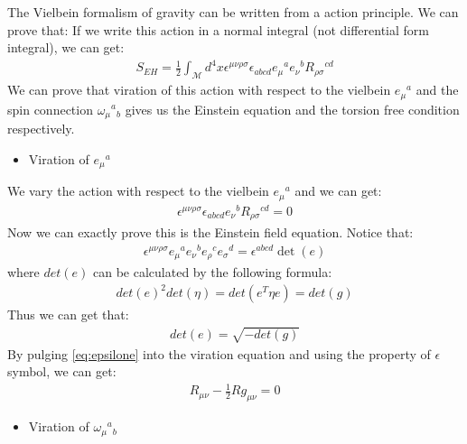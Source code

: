The Vielbein formalism of gravity can be written from a action
principle. We can prove that:
If we write this action in a normal integral (not differential form
integral), we can get:
\begin{align}
  S_{EH} = \displaystyle\frac{1}{2} \int_{\mathcal{M}} d^4x
  \epsilon^{\mu\nu\rho\sigma} \epsilon_{abcd} e_\mu{}^a e_\nu{}^b
  R_{\rho\sigma}{}^{cd}
\end{align}
We can prove that viration of this action with respect to the
vielbein $ e_\mu{}^a $ and the spin connection $ \omega_\mu{}^a{}_b $
gives us the Einstein equation and the torsion free condition respectively.
\begin{itemize}
  \item Viration of $ e_{\mu}{}^a $
\end{itemize}
We vary the action with respect to the vielbein $ e_\mu{}^a $ and we can get:
\begin{align}
  \epsilon^{\mu\nu\rho\sigma} \epsilon_{abcd} e_\nu{}^b
  R_{\rho\sigma}{}^{cd} = 0
\end{align}
Now we can exactly prove this is the Einstein field equation. Notice that:
\begin{align}\label{eq:epsilone}
  \epsilon^{\mu\nu\rho\sigma} e_{\mu}{}^a e_\nu{}^b e_\rho{}^c
  e_\sigma{}^d = \epsilon^{abcd} \det(e)
\end{align}
where $ det(e) $ can be calculated by the following formula:
\begin{align}
  det(e)^2 det(\eta) = det(e^T \eta e) = det(g)
\end{align}
Thus we can get that:
\begin{align}
  det(e) = \sqrt{-det(g)}
\end{align}
By pulging \cref{eq:epsilone} into the viration equation and using
the property of $ \epsilon $ symbol, we can get:
\begin{align}
  R_{\mu\nu} - \frac{1}{2} R g_{\mu\nu} = 0
\end{align}
\begin{itemize}
  \item Viration of $ \omega_\mu{}^a{}_b $
\end{itemize}
